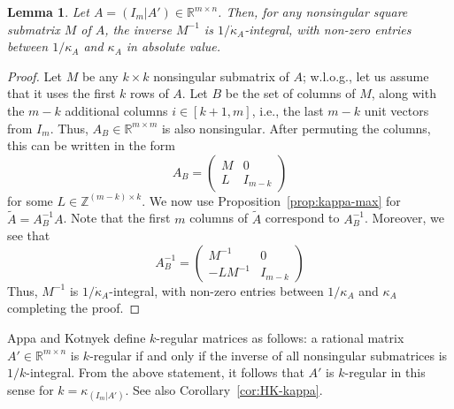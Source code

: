\documentclass[11pt, a4paper]{article}
\newcommand{\Le}{\kappa}
\newcommand{\1}{\mathbbm{1}}
\newcommand{\kd}{{\dot{\kappa}}}
\newtheorem{lemma}[theorem]{Lemma}
\theoremstyle{case}
\newcommand{\R}{\mathbb{R}}
\newcommand{\Z}{\mathbb{Z}}
\begin{document}
\begin{lemma}\label{lem:sub-inverse}
Let $A=(I_m|A')\in\R^{m\times n}$. Then, for any nonsingular square submatrix $M$ of $A$, the inverse $M^{-1}$ is $1/\kd_A$-integral, with non-zero entries between $1/\Le_A$ and $\Le_A$ in absolute value.
\end{lemma}
\begin{proof}
Let $M$ be any $k \times k$ nonsingular submatrix of $A$; w.l.o.g., let us assume that it uses the first $k$ rows of $A$. Let $B$ be the set of columns of $M$, along with the $m-k$ additional columns $i\in [k+1,m]$, i.e., the last $m-k$ unit vectors from $I_m$. Thus,
$A_B\in \R^{m\times m}$ is also nonsingular. After permuting the columns, this can be written in the form
\[
A_B=\left(\begin{array}{c|c}
M & 0  \\
\hline
L& I_{m-k} 
\end{array}\right)
\]
for some $L\in \Z^{(m-k)\times k}$.
We now use Proposition~\ref{prop:kappa-max}  for $
\tilde A = A_B^{-1} A$. 
Note that the first $m$ columns of $
\tilde A$ correspond to $A_B^{-1}$. Moreover, we see that
\[
A_B^{-1}=\left(\begin{array}{c|c}
 M^{-1} & 0 \\
\hline
-LM^{-1} & I_{m-k} 
\end{array}\right)
\]
Thus, $M^{-1}$ is $1/\dot\kappa_A$-integral, with non-zero entries between $1/\Le_A$ and $\Le_A$ completing the proof.
\end{proof}
Appa and Kotnyek define $k$-regular matrices as follows: a rational matrix $A'\in\R^{m\times n}$ is $k$-regular if and only if the inverse of all nonsingular submatrices is $1/k$-integral. From the above statement, it follows that $A'$ is $k$-regular in this sense for $k=\kappa_{(I_m|A')}$. See also
Corollary~\ref{cor:HK-kappa}.
\end{document}
